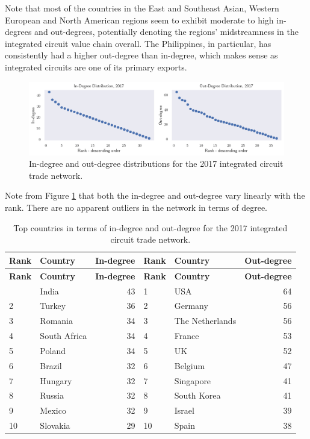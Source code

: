 \documentclass[12pt,letterpaper]{report}
\begin{document}
			Note that most of the countries in the East and Southeast Asian, Western European and North American regions seem to exhibit moderate to high in-degrees and out-degrees, potentially denoting the regions' midstreamness in the integrated circuit value chain overall. The Philippines, in particular, has consistently had a higher out-degree than in-degree, which makes 
			sense as integrated circuits are one of its primary exports.
			
			\begin{figure}[!h]
				\centering
				\includegraphics[width=\textwidth]{Fig506-DegreeDistribution.png}
				\caption{In-degree and out-degree distributions for the 2017 integrated circuit trade network.}\label{fig:506DegreeDistribution}
			\end{figure}
			
			Note from Figure \ref{fig:506DegreeDistribution} that both the in-degree and out-degree vary linearly with the rank. There are no apparent outliers in the network in terms of degree.
			
			\begin{longtable}{|l|l|r|l|l|r|}
				\caption{Top countries in terms of in-degree and out-degree for the 2017 integrated circuit trade network. \label{tab:tab01TopDegree}} \\
				\hline
				\textbf{\small Rank} & \textbf{\small Country} & \textbf{\small In-degree} & \textbf{\small Rank} &
				\textbf{\small Country} & \textbf{\small Out-degree} \\ 
				\hline
				\endfirsthead
				\hline
				\textbf{\small Rank} & \textbf{\small Country} & \textbf{\small In-degree} & \textbf{\small Rank} &
				\textbf{\small Country} & \textbf{\small Out-degree} \\ 
				\hline
				\endhead
				\hline
				\endfoot
				1 & India & 43 & 1 & USA & 64 \\
				2 & Turkey & 36 & 2 & Germany & 56 \\
				3 & Romania & 34 & 3 & The Netherlands & 56 \\
				4 & South Africa & 34 & 4 & France & 53 \\
				5 & Poland & 34 & 5 & UK & 52 \\
				6 & Brazil & 32 & 6 & Belgium & 47 \\
				7 & Hungary & 32 & 7 & Singapore & 41 \\
				8 & Russia & 32 & 8 & South Korea & 41 \\
				9 & Mexico & 32 & 9 & Israel & 39 \\
				10 & Slovakia & 29 & 10 & Spain & 38 \\
			\end{longtable}
		
\end{document}
